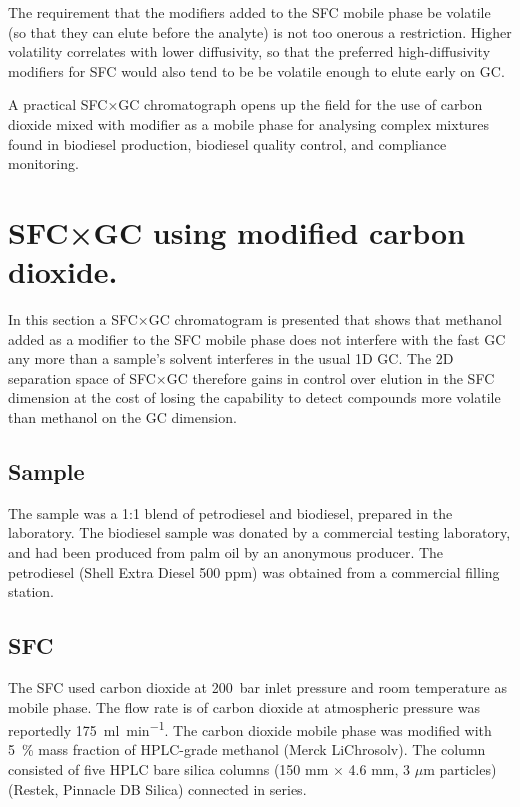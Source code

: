 The requirement that the modifiers added to the SFC mobile phase be volatile (so
that they can elute before the analyte) is not too onerous a restriction. Higher
volatility correlates with lower diffusivity, so that the preferred
high-diffusivity modifiers for SFC  would also tend to be be volatile enough to
elute early on GC. 

A practical SFC×GC chromatograph opens up the field for the use of carbon
dioxide mixed with modifier as a mobile phase for analysing complex mixtures
found in biodiesel production, biodiesel quality control, and compliance
monitoring.

\section[SFC×GC with modifier]{SFC×GC using modified carbon dioxide.}

In this section a SFC×GC chromatogram is presented that shows that methanol
added as a modifier to the SFC mobile phase does not interfere with the fast GC
any more than a sample's solvent interferes in the usual 1D GC. The 2D
separation space of SFC×GC therefore gains in control over elution in the SFC
dimension at the cost of losing the capability to detect compounds
more volatile than methanol on the GC dimension.

\subsection{Sample}

The sample was a 1:1 blend of petrodiesel and biodiesel, prepared in the
laboratory. The biodiesel sample was donated by a commercial testing laboratory,
and had been produced from palm oil by an anonymous producer. The petrodiesel
(Shell Extra Diesel 500 ppm) was obtained from a commercial filling station.

\subsection{SFC}

The SFC used carbon dioxide at \SI{200}{\bar} inlet pressure and room
temperature as mobile phase. The flow rate is of carbon dioxide at atmospheric
pressure was reportedly \SI{175}{\milli\litre\per\minute}. The carbon dioxide
mobile phase was modified with \SI{5}{\percent} mass fraction of HPLC-grade
methanol (Merck LiChrosolv). The column consisted of five HPLC bare silica
columns (150 mm $\times$ 4.6 mm, 3 $\mu$m particles) (Restek, Pinnacle DB
Silica) connected in series.

